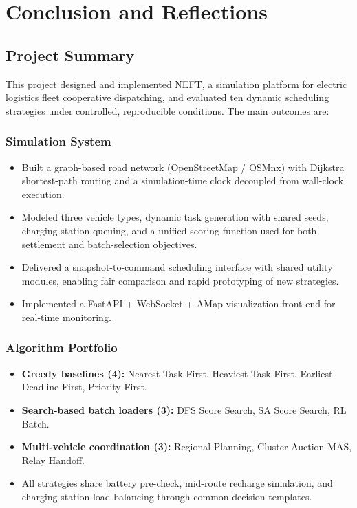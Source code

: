 
\chapter{Conclusion and Reflections}

\section{Project Summary}

This project designed and implemented NEFT, a simulation platform for electric logistics fleet cooperative dispatching, and evaluated ten dynamic scheduling strategies under controlled, reproducible conditions. The main outcomes are:

\subsection{Simulation System}

\begin{itemize}[leftmargin=4em]
    \item Built a graph-based road network (OpenStreetMap / OSMnx) with Dijkstra shortest-path routing and a simulation-time clock decoupled from wall-clock execution.
    \item Modeled three vehicle types, dynamic task generation with shared seeds, charging-station queuing, and a unified scoring function used for both settlement and batch-selection objectives.
    \item Delivered a snapshot-to-command scheduling interface with shared utility modules, enabling fair comparison and rapid prototyping of new strategies.
    \item Implemented a FastAPI + WebSocket + AMap visualization front-end for real-time monitoring.
\end{itemize}

\subsection{Algorithm Portfolio}

\begin{itemize}[leftmargin=4em]
    \item \textbf{Greedy baselines (4):} Nearest Task First, Heaviest Task First, Earliest Deadline First, Priority First.
    \item \textbf{Search-based batch loaders (3):} DFS Score Search, SA Score Search, RL Batch.
    \item \textbf{Multi-vehicle coordination (3):} Regional Planning, Cluster Auction MAS, Relay Handoff.
    \item All strategies share battery pre-check, mid-route recharge simulation, and charging-station load balancing through common decision templates.
\end{itemize}

